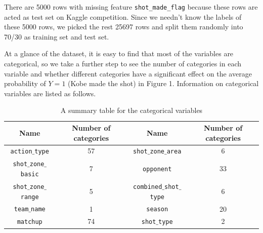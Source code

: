 \documentclass[a4paper,11pt,onecolumn,twoside]{article}
\begin{document}
\par
There are 5000 rows with missing feature \texttt{shot\_made\_flag} because these rows are acted as test set on Kaggle competition. Since we needn't know the labels of these 5000 rows, we picked the rest 25697 rows and split them randomly into 70/30 as training set and test set.\par
At a glance of the dataset, it is easy to find that most of the variables are categorical, so we take a further step to see the number of categories in each variable and whether different categories have a significant effect on the average probability of $Y=1$ (Kobe made the shot) in Figure 1. Information on categorical variables are listed as follows.\par
\begin{table}[htbp]
	\centering
	\begin{tabular}{cccc}
		\midrule[1.5pt]
		\textbf{Name} &\textbf{Number of categories}&\textbf{Name}&\textbf{Number of categories}\\ 
		\hline
		\texttt{action$\_$type}				&57 &\texttt{shot$\_$zone$\_$area}		&6\\
		\texttt{shot$\_$zone$\_$basic}  		&7  &\texttt{opponent}    				&33\\
		\texttt{shot$\_$zone$\_$range}		&5& 
		\texttt{combined$\_$shot$\_$type}  &6\\          
		\texttt{team$\_$name} 				&1&
		\texttt{season}       				&20\\  
		\texttt{matchup}						&74&	\texttt{shot$\_$type} 				&2\\
		\midrule[1.5pt]
	\end{tabular}
	\caption{A summary table for the categorical variables }
\end{table}
\end{document}
